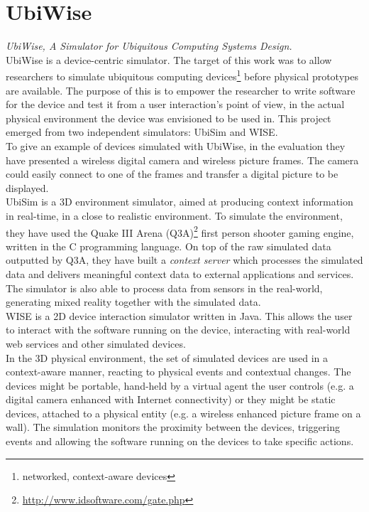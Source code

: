 \section{UbiWise}\label{sec:ubiwise}
\emph{UbiWise, A Simulator for Ubiquitous Computing Systems Design.}\\

UbiWise \cite{barton2003ubiwise} is a device-centric simulator. The target of this work was to allow researchers to simulate ubiquitous computing devices\footnote{networked, context-aware devices} before physical prototypes are available. The purpose of this is to empower the researcher to write software for the device and test it from a user interaction's point of view, in the actual physical environment the device was envisioned to be used in. This project emerged from two independent simulators: UbiSim and WISE.\\

To give an example of devices simulated with UbiWise, in the evaluation they have presented a wireless digital camera and wireless picture frames. The camera could easily connect to one of the frames and transfer a digital picture to be displayed.\\

UbiSim is a 3D environment simulator, aimed at producing context information in real-time, in a close to realistic environment. To simulate the environment, they have used the Quake III Arena (Q3A)\footnote{\url{http://www.idsoftware.com/gate.php}} first person shooter gaming engine, written in the C programming language. On top of the raw simulated data outputted by Q3A, they have built a \emph{context server} which processes the simulated data and delivers meaningful context data to external applications and services. The simulator is also able to process data from sensors in the real-world, generating mixed reality together with the simulated data.\\

WISE is a 2D device interaction simulator written in Java. This allows the user to interact with the software running on the device, interacting with real-world web services and other simulated devices.\\

In the 3D physical environment, the set of simulated devices are used in a context-aware manner, reacting to physical events and contextual changes. The devices might be portable, hand-held by a virtual agent the user controls (e.g. a digital camera enhanced with Internet connectivity) or they might be static devices, attached to a physical entity (e.g. a wireless enhanced picture frame on a wall). The simulation monitors the proximity between the devices, triggering events and allowing the software running on the devices to take specific actions.

